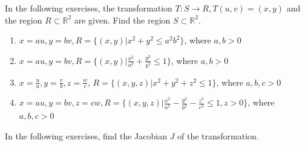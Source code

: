 \documentclass{exercises}
\begin{document}
In the following exercises, the transformation $T:S\to R,T(u,v)=(x,y)$ and the region $R\subset \mathbb{R}^{2}$ are given. Find the region $S\subset \mathbb{R}^{2}$.

\begin{enumerate}[resume]
\item $x=au,y=bv,R=\{(x,y)|x^{2}+y^{2}\le a^{2}b^{2}\}$, where $a,b>0$
\item $x=au,y=bv,R=\{(x,y)|\frac{x^{2}}{a^{2}}+\frac{y^{2}}{b^{2}}\le1\}$, where $a,b>0$
\item $x=\frac{u}{a},y=\frac{v}{b},z=\frac{w}{c}$, $R=\{(x,y,z)|x^{2}+y^{2}+z^{2}\le1\}$, where $a,b,c>0$
\item $x=au,y=bv,z=cw,R=\{(x,y,z)|\frac{x^{2}}{a^{2}}-\frac{y^{2}}{b^{2}}-\frac{z^{2}}{c^{2}}\le1,z>0\}$, where $a,b,c>0$
\end{enumerate}

In the following exercises, find the Jacobian $J$ of the transformation.
\end{document}
